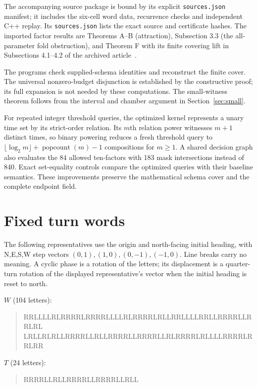 \documentclass[11pt]{article}
\theoremstyle{remark}\newtheorem{remark}[theorem]{Remark}
\begin{document}
The accompanying source package is bound by its explicit \texttt{sources.json} manifest; it includes the six-cell word data, recurrence checks and independent C++ replay.
Its \texttt{sources.json} lists the exact source and certificate hashes.
The imported factor results are Theorems A--B (attraction), Subsection 3.3
(the all-parameter fold obstruction), and Theorem F with its finite
covering lift in Subsections 4.1--4.2 of the archived article~\cite{project}.

The programs check supplied-schema identities and reconstruct the finite cover.
The universal nonzero-budget disjunction is established by the constructive
proof; its full expansion is not needed by these computations. The small-witness
theorem follows from the interval and chamber argument in Section~\ref{sec:small}.

For repeated integer threshold queries, the optimized kernel represents a
unary time set by its strict-order relation. Its $m$th relation power witnesses
$m+1$ distinct times, so binary powering reduces a fresh threshold query to
$\lfloor\log_2m\rfloor+\operatorname{popcount}(m)-1$ compositions for $m\ge1$.
A shared decision graph also evaluates the 84 allowed ten-factors with 183
mask intersections instead of 840. Exact set-equality controls compare the
optimized queries with their baseline semantics. These improvements preserve
the mathematical schema cover and the complete endpoint field.

\appendix
\section{Fixed turn words}\label{app:words}
The following representatives use the origin and north-facing initial heading,
with N,E,S,W step vectors $(0,1),(1,0),(0,-1),(-1,0)$.
Line breaks carry no meaning. A cyclic phase is a rotation of the letters;
its displacement is a quarter-turn rotation of the displayed representative's
vector when the initial heading is reset to north.

\noindent $W$ (104 letters):
\begin{quote}\ttfamily\small
RRLLLLRLRRRRLRRRRLLLLRLRRRRLRLLRRLLLLRRLLRRRRLLRRLRL\\
LRLLRLRLLRRRRLLRLLRRRRLLRRRRLLRLRRRRLRLLLLRRRRLRRLRR
\end{quote}

\noindent $T$ (24 letters):
\begin{quote}\ttfamily\small
RRRRLLRLLRRRRLLRRRRLLRLL
\end{quote}
\end{document}
